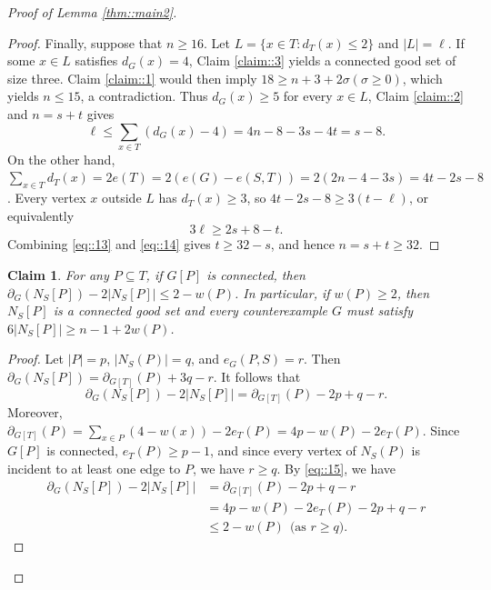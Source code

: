 \documentclass[11pt]{article}
\newtheorem{claim}{Claim}
\theoremstyle{definition}
\begin{document}
\begin{proof}[Proof of Lemma \ref{thm::main2}]
\begin{proof}
    Finally, suppose that $ n\geq 16$. Let $L=\{x\in T:d_T(x)\leq 2\}$  and $|L|=\ell$. If some $x\in L$ satisfies $d_G(x)=4$, Claim \ref{claim::3} yields a connected good set of size three. Claim \ref{claim::1} would then imply $18\geq n+3+2\sigma(\sigma\geq 0)$, which yields $n\leq 15$, a contradiction. Thus $d_G(x)\geq 5$ for every $x\in L$, Claim \ref{claim::2}  and $n=s+t$ gives
    \begin{equation}\label{eq::13}
      \ell \leq \sum_{x\in T}(d_G(x)-4)=4n-8-3s-4t= s-8.
    \end{equation}
    On the other hand, $\sum_{x\in T}d_T(x)=2e(T)=2(e(G)-e(S,T))=2(2n-4-3s)=4t-2s-8$.
    Every vertex $x$ outside $L$ has $d_T(x)\geq 3$, so $4t-2s-8\ge3(t-\ell)$, or equivalently
    \begin{equation}\label{eq::14}
      3\ell\geq 2s+8-t.
    \end{equation}
    Combining \eqref{eq::13} and \eqref{eq::14} gives $t \geq 32-s$, and hence $n=s+t\ge32$.
  \end{proof}

  \begin{claim}\label{claim::5}
    For any $P\subseteq T$, if $G[P]$ is connected, then $\partial_G(N_S[P])-2|N_S[P]|\leq 2-w(P)$. In particular, if $w(P)\geq 2$, then $N_S[P]$ is a connected good set and every counterexample $G$ must satisfy $6|N_S[P]|\geq n-1+2w(P)$.
  \end{claim}

  \begin{proof}
    Let $|P|=p$, $|N_S(P)|=q$, and $e_G(P,S)=r$. Then $\partial_G(N_S[P])=\partial_{G[T]}(P)+3q-r$.
    It follows that
    \begin{equation}\label{eq::15}
      \partial_G(N_S[P])-2|N_S[P]|=\partial_{G[T]}(P)-2p+q-r.
    \end{equation}
    Moreover, $\partial_{G[T]}(P)=\sum_{x\in P}(4-w(x))-2e_T(P)=4p-w(P)-2e_T(P)$.
    Since $G[P]$ is connected, $e_T(P)\geq p-1$, and since every vertex of $N_S(P)$ is incident to at least one edge to $P$, we have $r\geq q$. By \eqref{eq::15}, we have
    \begin{equation*}
      \begin{aligned}
        \partial_G(N_S[P])-2|N_S[P]| & =\partial_{G[T]}(P)-2p+q-r           \\
                                     & =4p-w(P)-2e_T(P)-2p+q-r              \\
                                     & \leq 2-w(P) ~~\mbox{(as $r\geq q$)}.
      \end{aligned}
    \end{equation*}


\end{proof}
\end{proof}
\end{document}
